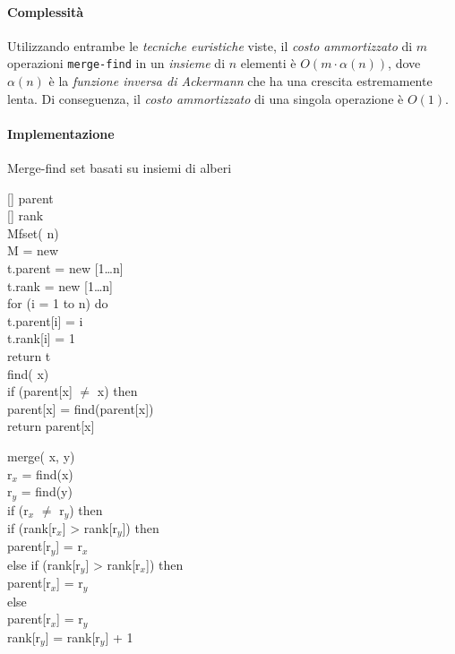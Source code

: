 \paragraph{Complessità}
Utilizzando entrambe le \emph{tecniche euristiche} viste, il \emph{costo
ammortizzato} di $m$ operazioni \texttt{merge-find} in un \emph{insieme} di $n$
elementi è $O(m\cdot\alpha(n))$, dove $\alpha(n)$ è la \emph{funzione inversa di
Ackermann} che ha una crescita estremamente lenta\footnotemark. Di conseguenza,
il \emph{costo ammortizzato} di una singola operazione è $O(1)$.


\newpage
\paragraph{Implementazione}
\begin{code}{Merge-find set basati su insiemi di alberi}
\begin{minipage}[t]{0.48\textwidth}
[] parent\\
[] rank\\

\ind{} Mfset( n)\\
     M = new \\
    t.parent = new [1\dots n]\\
    t.rank = new [1\dots n]\\
    \indf for (i = 1 to n) do\\
        t.parent[i] = i\\
        t.rank[i] = 1\\
    \indf return t\\

\ind{} find( x)\\
    \indf if (parent[x] $\neq$ x) then\\
        parent[x] = find(parent[x])\\
    \indf return parent[x]\\
\end{minipage}
\hfill
\begin{minipage}[t]{0.48\textwidth}
    \ind merge( x,  y)\\
         r$_x$ = find(x)\\
         r$_y$ = find(y)\\
        \indf if (r$_x$ $\neq$ r$_y$) then\\
            \indff if (rank[r$_x$] > rank[r$_y$]) then\\
                parent[r$_y$] = r$_x$\\
            \indff else if (rank[r$_y$] > rank[r$_x$]) then\\
                parent[r$_x$] = r$_y$\\
            \indff else\\
                parent[r$_x$] = r$_y$\\
                rank[r$_y$] = rank[r$_y$] + 1\\
\end{minipage}
\end{code}

